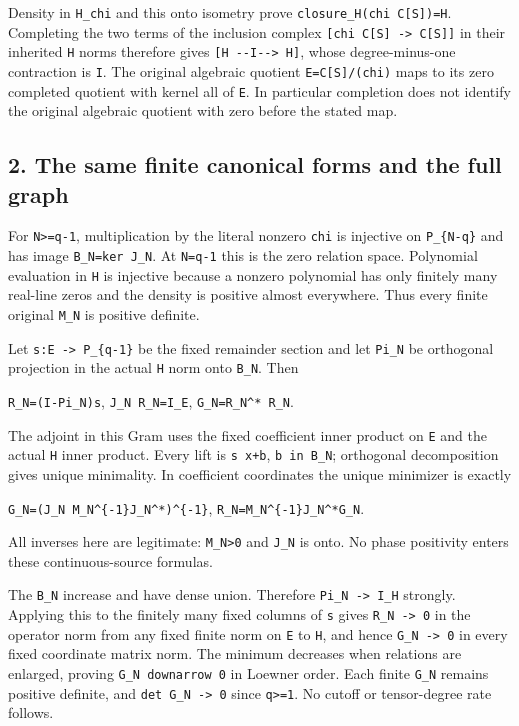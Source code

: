 Density in \texttt{H\_chi} and this onto isometry prove \texttt{closure\_H(chi\ C{[}S{]})=H}. Completing the two terms of the inclusion complex \texttt{{[}chi\ C{[}S{]}\ -\textgreater{}\ C{[}S{]}{]}} in their inherited \texttt{H} norms therefore gives \texttt{{[}H\ -\/-I-\/-\textgreater{}\ H{]}}, whose degree-minus-one contraction is \texttt{I}. The original algebraic quotient \texttt{E=C{[}S{]}/(chi)} maps to its zero completed quotient with kernel all of \texttt{E}. In particular completion does not identify the original algebraic quotient with zero before the stated map.

\subsection{2. The same finite canonical forms and the full graph}\label{the-same-finite-canonical-forms-and-the-full-graph}

For \texttt{N\textgreater{}=q-1}, multiplication by the literal nonzero \texttt{chi} is injective on \texttt{P\_\{N-q\}} and has image \texttt{B\_N=ker\ J\_N}. At \texttt{N=q-1} this is the zero relation space. Polynomial evaluation in \texttt{H} is injective because a nonzero polynomial has only finitely many real-line zeros and the density is positive almost everywhere. Thus every finite original \texttt{M\_N} is positive definite.

Let \texttt{s:E\ -\textgreater{}\ P\_\{q-1\}} be the fixed remainder section and let \texttt{Pi\_N} be orthogonal projection in the actual \texttt{H} norm onto \texttt{B\_N}. Then

\texttt{R\_N=(I-Pi\_N)s}, \texttt{J\_N\ R\_N=I\_E}, \texttt{G\_N=R\_N\^{}*\ R\_N}.

The adjoint in this Gram uses the fixed coefficient inner product on \texttt{E} and the actual \texttt{H} inner product. Every lift is \texttt{s\ x+b}, \texttt{b\ in\ B\_N}; orthogonal decomposition gives unique minimality. In coefficient coordinates the unique minimizer is exactly

\texttt{G\_N=(J\_N\ M\_N\^{}\{-1\}J\_N\^{}*)\^{}\{-1\}}, \texttt{R\_N=M\_N\^{}\{-1\}J\_N\^{}*G\_N}.

All inverses here are legitimate: \texttt{M\_N\textgreater{}0} and \texttt{J\_N} is onto. No phase positivity enters these continuous-source formulas.

The \texttt{B\_N} increase and have dense union. Therefore \texttt{Pi\_N\ -\textgreater{}\ I\_H} strongly. Applying this to the finitely many fixed columns of \texttt{s} gives \texttt{R\_N\ -\textgreater{}\ 0} in the operator norm from any fixed finite norm on \texttt{E} to \texttt{H}, and hence \texttt{G\_N\ -\textgreater{}\ 0} in every fixed coordinate matrix norm. The minimum decreases when relations are enlarged, proving \texttt{G\_N\ downarrow\ 0} in Loewner order. Each finite \texttt{G\_N} remains positive definite, and \texttt{det\ G\_N\ -\textgreater{}\ 0} since \texttt{q\textgreater{}=1}. No cutoff or tensor-degree rate follows.

